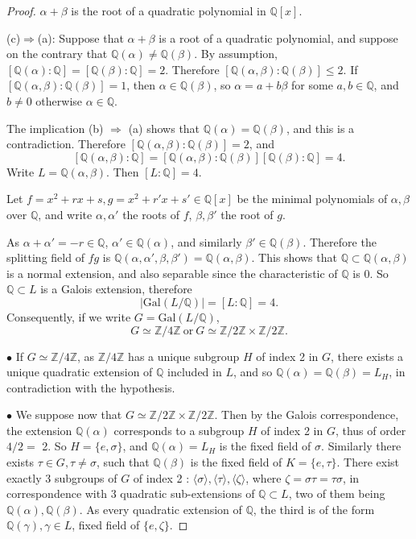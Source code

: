 \documentclass[11pt,a4paper]{article}
\newcommand{\Q}{\mathbb{Q}}
\newcommand{\Z}{\mathbb{Z}}
\newcommand{\Gal}{\mathrm{Gal}}
\begin{document}
\begin{proof}
$\alpha + \beta$ is the root of a quadratic polynomial in $\Q[x]$.

\bigskip

(c)$\Rightarrow$(a):
Suppose that $\alpha + \beta$ is a root of a quadratic polynomial, and suppose on the contrary that $\Q(\alpha) \ne \Q(\beta)$.
By assumption, $[\Q(\alpha) : \Q] = [\Q(\beta):\Q] = 2$. Therefore $[\Q(\alpha,\beta) : \Q(\beta)] \leq 2$. If $[\Q(\alpha,\beta) : \Q(\beta)] = 1$, then $\alpha \in \Q(\beta)$, so $\alpha = a + b \beta$ for some $a,b \in \Q$, and $b\ne 0$ otherwise $\alpha \in \Q$.

 The implication (b) $\Rightarrow $ (a) shows that $\Q(\alpha) = \Q(\beta)$, and this is a contradiction. Therefore $[\Q(\alpha,\beta) : \Q(\beta)] = 2$, and
$$[\Q(\alpha,\beta) : \Q] = [\Q(\alpha,\beta) : \Q(\beta)] [\Q(\beta) : \Q] = 4.$$
Write $L = \Q(\alpha,\beta)$. Then $[L :\Q]=4$.

Let $f = x^2 +rx+s,g = x^2+r'x+s'  \in \Q[x]$ be the minimal polynomials of $\alpha,\beta$ over $\Q$, and write $\alpha, \alpha'$ the roots of $f$, $\beta, \beta'$ the root of $g$.

As $\alpha+\alpha'= -r \in \Q$, $\alpha' \in \Q(\alpha)$, and similarly $\beta' \in \Q(\beta)$. Therefore the splitting field of $fg$ is $\Q(\alpha,\alpha',\beta,\beta') = \Q(\alpha,\beta)$.  This shows that $\Q \subset \Q(\alpha,\beta)$ is a normal extension, and also separable since the characteristic of $\Q$ is 0. So $\Q \subset L$ is a Galois extension, therefore
$$ \vert \Gal(L/\Q) \vert = [L:\Q]=4.$$
Consequently, if we write $G =  \Gal(L/\Q)$,
$$G \simeq \Z/4\Z \ \mathrm{or}\ G \simeq \Z/2\Z \times \Z/2\Z.$$

$\bullet$ If $G \simeq \Z/4\Z$, as $ \Z/4\Z$ has a unique subgroup $H$ of index 2 in $G$, there exists a unique quadratic extension of $\Q$ included in $L$, and so $\Q(\alpha) = \Q(\beta) = L_H$, in contradiction with the hypothesis.

$\bullet$ We suppose now that $G \simeq \Z/2\Z \times \Z/2\Z$. Then by the Galois correspondence, the extension $\Q(\alpha)$ corresponds to a subgroup $H$ of index 2 in $G$, thus of order $4/2 =$ 2. So $H = \{e,\sigma\}$, and $\Q(\alpha) = L_H$ is the fixed field of $\sigma$. Similarly there exists $\tau \in G, \tau \neq \sigma$, such that $\Q(\beta)$ is the fixed field of $K = \{e ,\tau\}$.
There exist exactly 3 subgroups of $G$ of index 2 : $\langle \sigma \rangle, \langle \tau \rangle,\langle \zeta \rangle$, where $\zeta = \sigma \tau = \tau \sigma$,  in correspondence with 3 quadratic sub-extensions of $\Q \subset L$,  two of them being $\Q(\alpha), \Q(\beta)$. As every quadratic extension of $\Q$, the third is of the form $\Q(\gamma), \gamma \in L$, fixed field of $\{e,\zeta\}$.


\end{proof}
\end{document}
